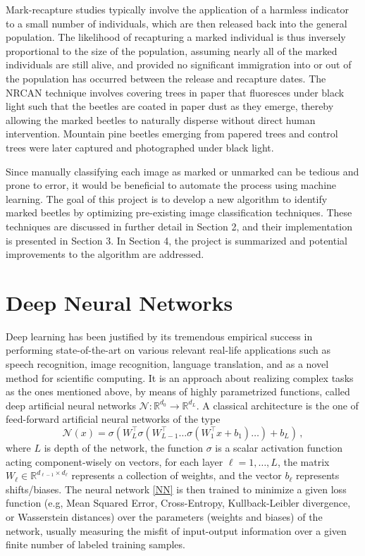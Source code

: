 \documentclass[11pt]{m2pi_v2}
\begin{document}
Mark-recapture studies typically involve the application of a harmless indicator to a small number of individuals, which are then released back into the general population. The likelihood of recapturing a marked individual is thus inversely proportional to the size of the population, assuming nearly all of the marked individuals are still alive, and provided no significant immigration into or out of the population has occurred between the release and recapture dates. The NRCAN technique involves covering trees in paper that fluoresces under black light such that the beetles are coated in paper dust as they emerge, thereby allowing the marked beetles to naturally disperse without direct human intervention. Mountain pine beetles emerging from papered trees and control trees were later captured and photographed under black light.

Since manually classifying each image as marked or unmarked can be tedious and prone to error, it would be beneficial to automate the process using machine learning. 
The goal of this project is to develop a new algorithm to identify marked beetles by optimizing pre-existing image classification techniques.
These techniques are discussed in further detail in Section 2, and their implementation is presented in Section 3. In Section 4, the project is summarized and potential improvements to the algorithm are addressed. 





\section{Deep Neural Networks}
Deep learning has been justified by its tremendous empirical success in performing state-of-the-art on various relevant real-life applications such as speech recognition, image recognition, language translation, and as a novel method for scientiﬁc computing. It is an approach about realizing complex tasks as the ones mentioned above, by means of highly parametrized functions, called deep artiﬁcial neural networks $\mathcal{N}: \mathbb{R}^{d_0}\to  \mathbb{R}^{d_L}$. A classical architecture is the one of feed-forward artiﬁcial neural networks of the type
\begin{equation}\label{NN}
\mathcal{N}(x)=\sigma\left(W_{L}^{\top} \sigma\left(W_{L-1}^{\top} \ldots \sigma\left(W_{1}^{\top} x+b_{1}\right) \ldots\right)+b_{L}\right)\,,
\end{equation}
where $L$ is depth of the network,  the function $\sigma$ is a scalar activation function acting component-wisely on vectors, for each layer $\ell=1,\dots,L$, the matrix $W_\ell\in \mathbb{R}^{d_{\ell-1}\times d_{\ell}}$ represents a collection of weights, and the vector $b_\ell$ represents shifts/biases. The neural network \eqref{NN} is then trained to minimize a given loss function (e.g, Mean Squared Error, Cross-Entropy, Kullback-Leibler divergence, or Wasserstein distances) over the parameters (weights and biases) of the network, usually measuring the misfit of input-output information over a given finite number of labeled training samples.
\end{document}
